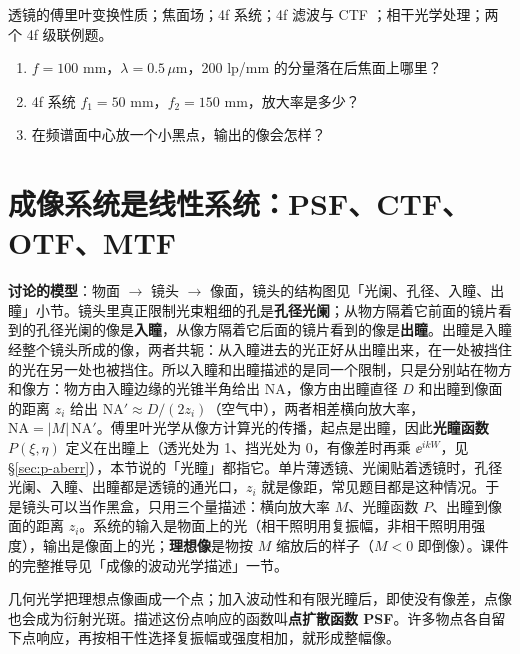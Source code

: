\psee 透镜的傅里叶变换性质\pageref{sec:lensFT}；焦面场\pageref{sec:focalplane}；4f 系统\pageref{sec:4f}；4f 滤波与 CTF \pageref{sec:4fctf}；相干光学处理\pageref{sec:processing}；两个 4f 级联例题\pageref{ex:v-4f2}。

\begin{enumerate}[label=\arabic*.]
\item $f=100$ mm，$\lambda=0.5\,\mu$m，200 lp/mm 的分量落在后焦面上哪里？
\item 4f 系统 $f_1=50$ mm，$f_2=150$ mm，放大率是多少？
\item 在频谱面中心放一个小黑点，输出的像会怎样？
\end{enumerate}

\section{成像系统是线性系统：PSF、CTF、OTF、MTF}\label{sec:p-imaging}

\textbf{讨论的模型}：物面 $\to$ 镜头 $\to$ 像面，镜头的结构图见\pageref{sec:p-pupil}「光阑、孔径、入瞳、出瞳」小节。镜头里真正限制光束粗细的孔是\textbf{孔径光阑}；从物方隔着它前面的镜片看到的孔径光阑的像是\textbf{入瞳}，从像方隔着它后面的镜片看到的像是\textbf{出瞳}。出瞳是入瞳经整个镜头所成的像，两者共轭：从入瞳进去的光正好从出瞳出来，在一处被挡住的光在另一处也被挡住。所以入瞳和出瞳描述的是同一个限制，只是分别站在物方和像方：物方由入瞳边缘的光锥半角给出 $\mathrm{NA}$，像方由出瞳直径 $D$ 和出瞳到像面的距离 $z_i$ 给出 $\mathrm{NA}'\approx D/(2z_i)$（空气中），两者相差横向放大率，$\mathrm{NA}=|M|\,\mathrm{NA}'$。傅里叶光学从像方计算光的传播，起点是出瞳，因此\textbf{光瞳函数} $P(\xi,\eta)$ 定义在出瞳上（透光处为 1、挡光处为 0，有像差时再乘 $\ee^{ikW}$，见 §\ref{sec:p-aberr}），本节说的「光瞳」都指它。单片薄透镜、光阑贴着透镜时，孔径光阑、入瞳、出瞳都是透镜的通光口，$z_i$ 就是像距，常见题目都是这种情况。于是镜头可以当作黑盒，只用三个量描述：横向放大率 $M$、光瞳函数 $P$、出瞳到像面的距离 $z_i$。系统的输入是物面上的光（相干照明用复振幅，非相干照明用强度），输出是像面上的光；\textbf{理想像}是物按 $M$ 缩放后的样子（$M<0$ 即倒像）。课件的完整推导见\pageref{sec:waveimg}「成像的波动光学描述」一节。

\begin{idea}[一句话]
几何光学把理想点像画成一个点；加入波动性和有限光瞳后，即使没有像差，点像也会成为衍射光斑。描述这份点响应的函数叫\textbf{点扩散函数 PSF}。许多物点各自留下点响应，再按相干性选择复振幅或强度相加，就形成整幅像。
\end{idea}

